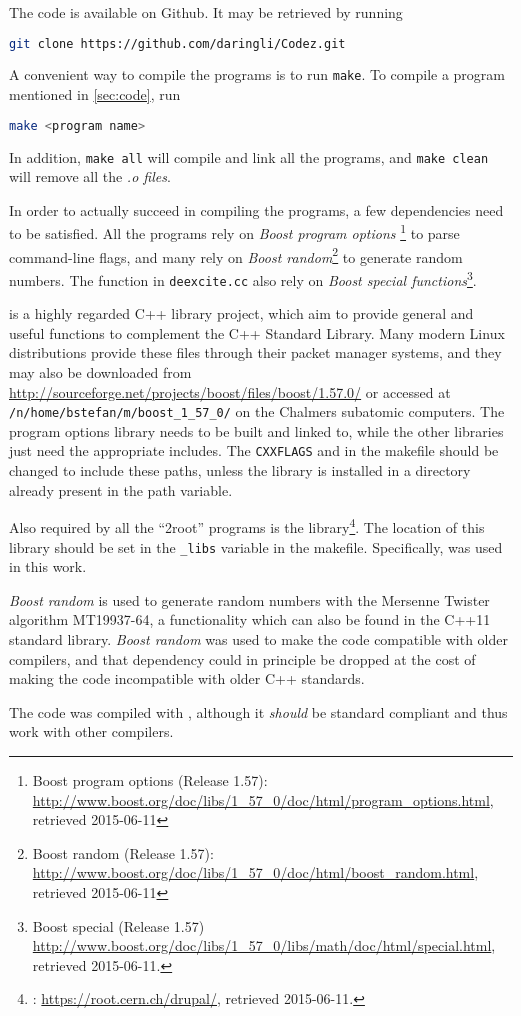 The code is available on Github. It may be retrieved by running
\begin{lstlisting}[language=bash]
git clone https://github.com/daringli/Codez.git
\end{lstlisting}

A convenient way to compile the programs is to run \texttt{make}. To compile a program mentioned in \autoref{sec:code}, run 
\begin{lstlisting}[language=bash]
make <program name>
\end{lstlisting}
In addition, \texttt{make all} will compile and link all the programs, and \texttt{make clean} will remove all the \emph{.o files}.

In order to actually succeed in compiling the programs, a few dependencies need to be satisfied. All the programs rely on \emph{Boost program options} \footnote{Boost program options (Release 1.57): \url{http://www.boost.org/doc/libs/1_57_0/doc/html/program_options.html}, retrieved 2015-06-11} to parse command-line flags, and many rely on \emph{Boost random}\footnote{Boost random (Release 1.57): \url{http://www.boost.org/doc/libs/1_57_0/doc/html/boost_random.html}, retrieved 2015-06-11} to generate random numbers. The function in \texttt{deexcite.cc} also rely on \emph{Boost special functions}\footnote{Boost special (Release 1.57) \url{http://www.boost.org/doc/libs/1_57_0/libs/math/doc/html/special.html}, retrieved 2015-06-11.}.

 is a highly regarded C++ library project, which aim to provide general and useful functions to complement the  C++ Standard Library. Many modern Linux distributions provide these files through their packet manager systems, and they may also be downloaded from \url{http://sourceforge.net/projects/boost/files/boost/1.57.0/} or accessed at \texttt{/n/home/bstefan/m/boost\_1\_57\_0/} on the Chalmers subatomic computers. The program options library needs to be built and linked to, while the other libraries just need the appropriate includes. The \texttt{CXXFLAGS} and in the makefile should be changed to include these paths, unless the library is installed in a directory already present in the path variable.

Also required by all the ``2root'' programs is the  library\footnote{: \url{https://root.cern.ch/drupal/}, retrieved 2015-06-11.}. The location of this library should be set in the \texttt{\_libs} variable in the makefile. Specifically,  was used in this work.

\emph{Boost random} is used to generate random numbers with the Mersenne Twister algorithm MT19937-64, a functionality which can also be found in the C++11 standard library. \emph{Boost random} was used to make the code compatible with older compilers, and that dependency could in principle be dropped at the cost of making the code incompatible with older C++ standards.

The code was compiled with , although it \emph{should} be standard compliant and thus work with other compilers.